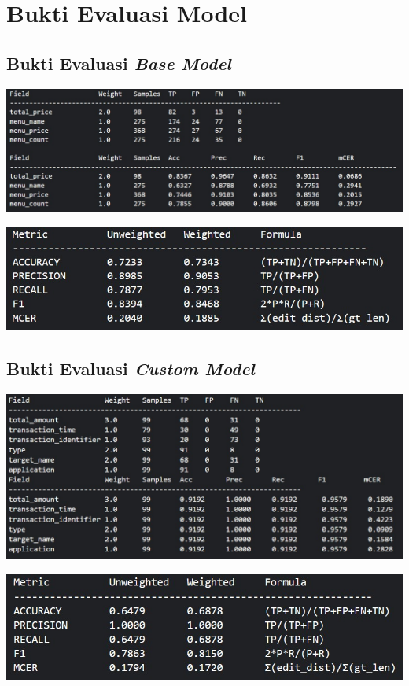 \chapter{Bukti Evaluasi Model}

\section{Bukti Evaluasi \emph{Base Model}}

\includegraphics[width=1\textwidth]{images/eval-model/field-wise-cord-v2.jpg}

\includegraphics[width=1\textwidth]{images/eval-model/overall-cord-v2.jpg}

\section{Bukti Evaluasi \emph{Custom Model}}
\includegraphics[width=1\textwidth]{images/eval-model/field-wise-qris-tf.jpg}

\includegraphics[width=1\textwidth]{images/eval-model/overall-qris-tf.jpg}
